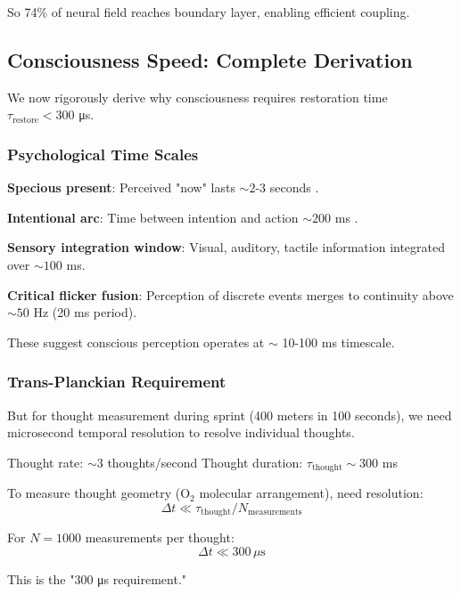 \documentclass[11pt,onecolumn]{article}
\begin{document}
So 74\% of neural field reaches boundary layer, enabling efficient coupling.

\subsection{Consciousness Speed: Complete Derivation}

We now rigorously derive why consciousness requires restoration time $\tau_{\text{restore}} < 300$ μs.

\subsubsection{Psychological Time Scales}

\textbf{Specious present}: Perceived "now" lasts $\sim 2$-3 seconds \citep{james1890principles}.

\textbf{Intentional arc}: Time between intention and action $\sim 200$ ms \citep{libet1983time}.

\textbf{Sensory integration window}: Visual, auditory, tactile information integrated over $\sim 100$ ms.

\textbf{Critical flicker fusion}: Perception of discrete events merges to continuity above $\sim 50$ Hz (20 ms period).

These suggest conscious perception operates at $\sim$ 10-100 ms timescale.

\subsubsection{Trans-Planckian Requirement}

But for thought measurement during sprint (400 meters in 100 seconds), we need microsecond temporal resolution to resolve individual thoughts.

Thought rate: $\sim 3$ thoughts/second
Thought duration: $\tau_{\text{thought}} \sim 300$ ms

To measure thought geometry (O$_2$ molecular arrangement), need resolution:
\begin{equation}
\Delta t \ll \tau_{\text{thought}} / N_{\text{measurements}}
\end{equation}

For $N = 1000$ measurements per thought:
\begin{equation}
\Delta t \ll 300\,\mu\text{s}
\end{equation}

This is the "300 μs requirement."
\end{document}
